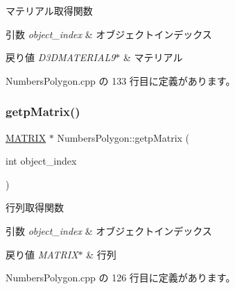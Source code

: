 マテリアル取得関数 


\begin{DoxyParams}{引数}
{\em object\+\_\+index} & オブジェクトインデックス \\
\hline
\end{DoxyParams}

\begin{DoxyRetVals}{戻り値}
{\em D3\+D\+M\+A\+T\+E\+R\+I\+A\+L9$\ast$} & マテリアル \\
\hline
\end{DoxyRetVals}


 Numbers\+Polygon.\+cpp の 133 行目に定義があります。

\mbox{\label{class_numbers_polygon_a733cb6576e892e006c300b5c9aaeef76}} 
\subsubsection{\texorpdfstring{getp\+Matrix()}{getpMatrix()}}
{\footnotesize\ttfamily \mbox{\hyperlink{_matrix_8h_a032295cd9fb1b711757c90667278e744}{M\+A\+T\+R\+IX}} $\ast$ Numbers\+Polygon\+::getp\+Matrix (\begin{DoxyParamCaption}\item[{int}]{object\+\_\+index }\end{DoxyParamCaption})}



行列取得関数 


\begin{DoxyParams}{引数}
{\em object\+\_\+index} & オブジェクトインデックス \\
\hline
\end{DoxyParams}

\begin{DoxyRetVals}{戻り値}
{\em M\+A\+T\+R\+I\+X$\ast$} & 行列 \\
\hline
\end{DoxyRetVals}


 Numbers\+Polygon.\+cpp の 126 行目に定義があります。

\mbox{\label{class_numbers_polygon_acb7dad87d99bd796323ccf251fc96384}} 
